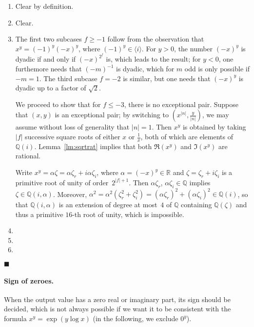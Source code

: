 \documentclass [12pt]{article}
\newcommand {\Q}{\mathbb Q}
\newcommand {\R}{\mathbb R}
\renewcommand {\leq}{\leqslant}
\renewcommand {\geq}{\geqslant}
\newenvironment{proof}{\noindent{\bf Proof:}}{{\hspace* {\fill}$\blacksquare$}}
\begin{document}
\begin {proof}
\begin {enumerate}
\item
Clear by definition.
\item
Clear.
\item
The first two subcases $f \geq -1$ follow from the observation that
$x^y = (-1)^y (-x)^y$, where $(-1)^y \in \langle i \rangle$.
For $y > 0$, the number $(-x)^y$ is dyadic if and only if $(-x)^{2^f}$ is,
which leads to the result; for $y < 0$, one furthemore needs that
$(-m)^{-1}$ is dyadic, which for $m$ odd is only possible if $-m = 1$.
The third subcase $f = -2$ is similar, but one needs that $(-x)^y$ is dyadic
up to a factor of $\sqrt 2$.

We proceed to show that for $f \leq -3$, there is no exceptional pair.
Suppose that $(x, y)$ is an exceptional pair; by switching to
$\left( x^{|n|}, \frac {y}{|n|} \right)$, we may assume
without loss of generality that $|n| = 1$. Then $x^y$ is obtained by
taking $|f|$ successive square roots of either $x$ or $\frac {1}{x}$, both
of which are elements of $\Q (i)$. Lemma~\ref {lm:sqrtrat} implies
that both $\Re (x^y)$ and $\Im (x^y)$ are rational.

Write $x^y = \alpha \zeta = \alpha \zeta_r + i \alpha \zeta_i$, where
$\alpha = (-x)^y \in \R$ and $\zeta = \zeta_r + i \zeta_i$ is a primitive root
of unity of order~$2^{|f| + 1}$.
Then $\alpha \zeta_r$, $\alpha \zeta_i \in \Q$ implies $\zeta \in \Q (i, \alpha)$.
Moreover,
$\alpha^2 = \alpha^2 (\zeta_r^2 + \zeta_i^2) =
(\alpha \zeta_r)^2 + (\alpha \zeta_i)^2 \in \Q (i)$, so that $\Q (i, \alpha)$
is an extension of degree at most~$4$ of $\Q$ containing $\Q (\zeta)$
and thus a primitive $16$-th root of unity, which is impossible.
\item
\item
\item
\end {enumerate}
\end {proof}

\paragraph{Sign of zeroes.}
When the output value has a zero real or imaginary part, its sign should be
decided, which is not always possible if we want it to be consistent with the
formula $x^y = \exp(y\log x)$ (in the following, we exclude $0^y$).
\end{document}
